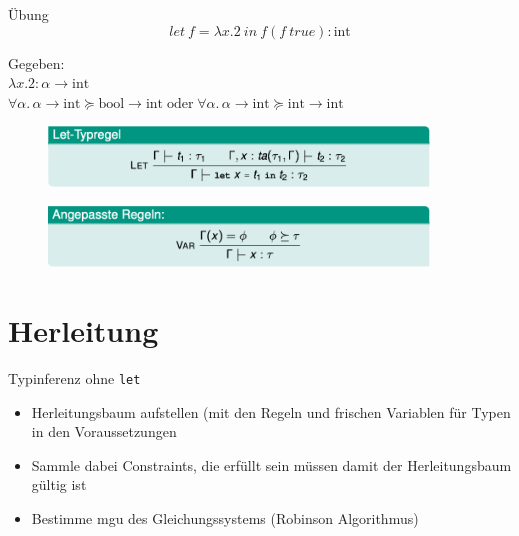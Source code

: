 \documentclass{beamer}
\begin{document}
\begin{frame}{Übung}
    $$let \: f=\lambda x.2 \: in \: f(f \: true):\text{int}$$

    Gegeben:\\
    $\lambda x.2:\alpha \rightarrow \text{int}$ \\ 
    $\forall \alpha. \, \alpha \rightarrow \text{int} \succeq \text{bool} \rightarrow \text{int} \; \text{oder} \; \forall \alpha. \, \alpha \rightarrow \text{int} \succeq \text{int} \rightarrow \text{int}$

    \begin{figure}
        \centering
        \includegraphics[width=0.9\textwidth]{slides/images/let_regel.png}
    \end{figure}

    \begin{figure}
        \centering
        \includegraphics[width=0.9\textwidth]{slides/images/var_regel.png}
    \end{figure}
\end{frame}

\section{Herleitung}

\begin{frame}{Typinferenz ohne \texttt{let}}
    \begin{itemize}
        \item Herleitungsbaum aufstellen (mit den Regeln und frischen Variablen für Typen in den Voraussetzungen
        \item Sammle dabei Constraints, die erfüllt sein müssen damit der Herleitungsbaum gültig ist
        \item Bestimme mgu des Gleichungssystems (Robinson Algorithmus)
    \end{itemize}
\end{frame}
\end{document}
